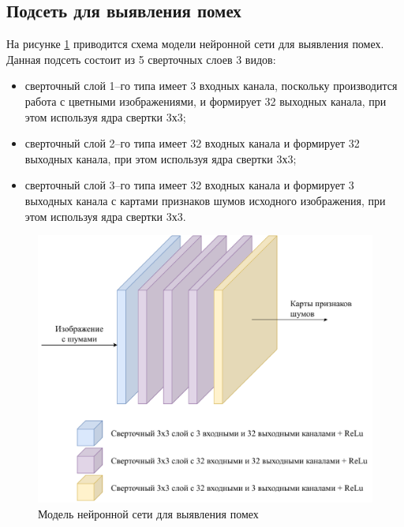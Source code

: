 \subsection{Подсеть для выявления помех}
На рисунке \ref{fig:my_fcn} приводится схема модели нейронной сети для выявления помех. Данная подсеть состоит из 5 сверточных слоев 3 видов:
\begin{itemize}
    \item сверточный слой 1--го типа имеет 3 входных канала, поскольку производится работа с цветными изображениями, и формирует 32 выходных канала, при этом используя ядра свертки 3х3;
    \item сверточный слой 2--го типа имеет 32 входных канала и формирует 32 выходных канала, при этом используя ядра свертки 3х3;
    \item сверточный слой 3--го типа имеет 32 входных канала и формирует 3 выходных канала с картами признаков шумов исходного изображения, при этом используя ядра свертки 3х3.
\end{itemize}

\begin{figure}[h!btp]
	\centering
	\includegraphics[scale = 0.8]{inc/design/fcn.pdf}
	\caption{Модель нейронной сети для выявления помех}
	\label{fig:my_fcn}	
\end{figure}

